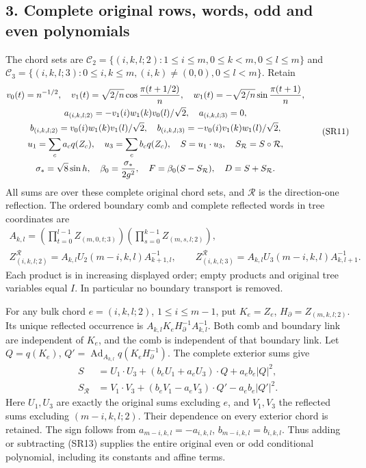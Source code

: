 \documentclass[11pt]{article}
\begin{document}
\subsection*{3. Complete original rows, words, odd and even polynomials}

The chord sets are
\(\mathcal C_2=\{(i,k,l;2):1\le i\le m,0\le k<m,0\le l\le m\}\) and
\(\mathcal C_3=\{(i,k,l;3):0\le i,k\le m,(i,k)\ne(0,0),0\le l<m\}\).
Retain
\[
\begin{gathered}
v_0(t)=n^{-1/2},\quad v_1(t)=\sqrt{2/n}\cos{\pi(t+1/2)\over n},
\quad w_1(t)=-\sqrt{2/n}\sin{\pi(t+1)\over n},\\
a_{(i,k,l;2)}=-v_1(i)w_1(k)v_0(l)/\sqrt2,\quad a_{(i,k,l;3)}=0,\\
b_{(i,k,l;2)}=v_0(i)w_1(k)v_1(l)/\sqrt2,\quad
b_{(i,k,l;3)}=-v_0(i)v_1(k)w_1(l)/\sqrt2,\\
u_1=\sum_ca_cq(Z_c),\quad u_3=\sum_cb_cq(Z_c),\quad
S=u_1\cdot u_3,\quad S_{\mathcal R}=S\circ\mathcal R,\\
\sigma_*=\sqrt8\sin h,\quad\beta_0={\sigma_*\over2g^2},\quad
F=\beta_0(S-S_{\mathcal R}),\quad D=S+S_{\mathcal R}.
\end{gathered}\tag{SR11}
\]
All sums are over these complete original chord sets, and \(\mathcal R\) is the direction-one reflection. The ordered boundary comb and complete reflected words in tree coordinates are
\[
\begin{gathered}
A_{k,l}=\left(\prod_{t=0}^{l-1}Z_{(m,0,t;3)}\right)
\left(\prod_{s=0}^{k-1}Z_{(m,s,l;2)}\right),\\
Z^{\mathcal R}_{(i,k,l;2)}=A_{k,l}U_2(m-i,k,l)A_{k+1,l}^{-1},\qquad
Z^{\mathcal R}_{(i,k,l;3)}=A_{k,l}U_3(m-i,k,l)A_{k,l+1}^{-1}.
\end{gathered}\tag{SR12}
\]
Each product is in increasing displayed order; empty products and original tree variables equal \(I\). In particular no boundary transport is removed.

For any bulk chord \(e=(i,k,l;2)\), \(1\le i\le m-1\), put \(K_e=Z_e\), \(H_\partial=Z_{(m,k,l;2)}\). Its unique reflected occurrence is
\(A_{k,l}K_eH_\partial^{-1}A_{k,l}^{-1}\).
Both comb and boundary link are independent of \(K_e\), and the comb is independent of that boundary link. Let \(Q=q(K_e)\), \(Q'=\operatorname{Ad}_{A_{k,l}}q(K_eH_\partial^{-1})\). The complete exterior sums give
\[
\begin{aligned}
S&=U_1\cdot U_3+(b_eU_1+a_eU_3)\cdot Q+a_eb_e|Q|^2,\\
S_{\mathcal R}&=V_1\cdot V_3+(b_eV_1-a_eV_3)\cdot Q'-a_eb_e|Q'|^2.
\end{aligned}\tag{SR13}
\]
Here \(U_1,U_3\) are exactly the original sums excluding \(e\), and \(V_1,V_3\) the reflected sums excluding \((m-i,k,l;2)\). Their dependence on every exterior chord is retained. The sign follows from \(a_{m-i,k,l}=-a_{i,k,l}\), \(b_{m-i,k,l}=b_{i,k,l}\). Thus adding or subtracting (SR13) supplies the entire original even or odd conditional polynomial, including its constants and affine terms.
\end{document}
